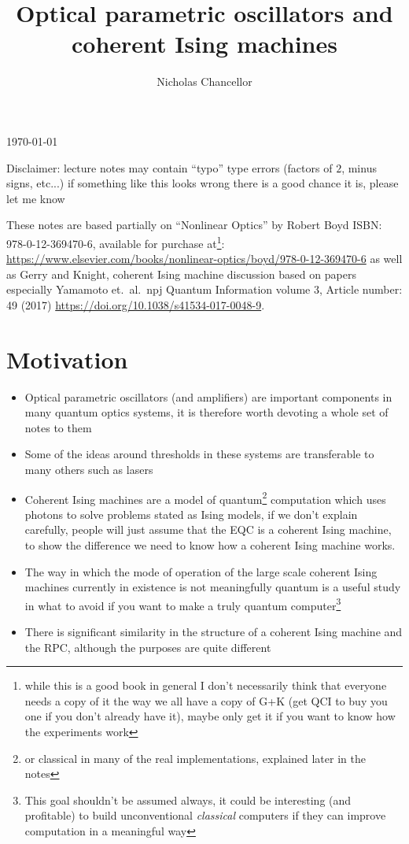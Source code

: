 \documentclass[english]{article}
\begin{document}
\title{Optical parametric oscillators and coherent Ising machines}
\author{Nicholas Chancellor}


\maketitle


\today %


{\small Disclaimer: lecture notes may contain ``typo'' type errors (factors of $2$, minus signs, etc...) if something like this looks wrong there is a good chance it is, please let me know}

These notes are based partially on ``Nonlinear Optics'' by Robert Boyd ISBN: 978-0-12-369470-6, available for purchase at\footnote{while this is a good book in general I don't necessarily think that everyone needs a copy of  it the way we all have a copy of G+K (get QCI to buy you one if you don't already have it), maybe only get it if you want to know how the experiments work}:\\ \href{https://www.elsevier.com/books/nonlinear-optics/boyd/978-0-12-369470-6}{https://www.elsevier.com/books/nonlinear-optics/boyd/978-0-12-369470-6} as well as Gerry and Knight, coherent Ising machine discussion based on papers especially Yamamoto et.~al.~npj Quantum Information volume 3, Article number: 49 (2017) \href{https://doi.org/10.1038/s41534-017-0048-9}{https://doi.org/10.1038/s41534-017-0048-9}.


\section{Motivation}
\begin{itemize}
\item Optical parametric oscillators (and amplifiers) are important components in many quantum optics systems, it is therefore worth devoting a whole set of notes to them
\item Some of the ideas around thresholds in these systems are transferable to many others such as lasers
\item Coherent Ising machines are a model of quantum\footnote{or classical in many of the real implementations, explained later in the notes} computation which uses photons to solve problems stated as Ising models, if we don't explain carefully, people will just assume that the EQC is a coherent Ising machine, to show the difference we need to know how a coherent Ising machine works.
\item The way in which the mode of operation of the large scale coherent Ising machines currently in existence is not meaningfully quantum is a useful study in what to avoid if you want to make a truly quantum computer\footnote{This goal shouldn't be assumed always, it could be interesting (and profitable) to build unconventional \emph{classical} computers if they can improve computation in a meaningful way}
\item There is significant similarity in the structure of a coherent Ising machine and the RPC, although the purposes are quite different
\end{itemize}
\end{document}
